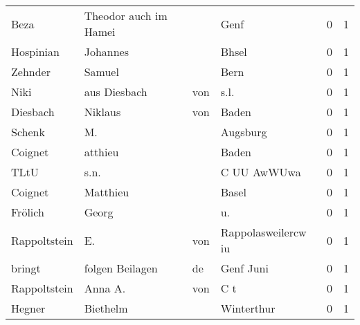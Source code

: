 \begin{tabular}{llllrr}
                     Beza &              Theodor auch im Hamei &             &                                        Genf &          0 &         1 \\
                Hospinian &                           Johannes &             &                                       Bhsel &          0 &         1 \\
                  Zehnder &                             Samuel &             &                                        Bern &          0 &         1 \\
                     Niki &                      aus  Diesbach &         von &                                        s.l. &          0 &         1 \\
                 Diesbach &                            Niklaus &         von &                                       Baden &          0 &         1 \\
                   Schenk &                                 M. &             &                                    Augsburg &          0 &         1 \\
                  Coignet &                            atthieu &             &                                       Baden &          0 &         1 \\
                     TLtU &                               s.n. &             &                                 C UU AwWUwa &          0 &         1 \\
                  Coignet &                           Matthieu &             &                                       Basel &          0 &         1 \\
                  Frölich &                              Georg &             &                                         u.  &          0 &         1 \\
             Rappoltstein &                                 E. &         von &                         Rappolasweilercw iu &          0 &         1 \\
                   bringt &                    folgen Beilagen &          de &                                   Genf Juni &          0 &         1 \\
             Rappoltstein &                            Anna A. &         von &                                         C t &          0 &         1 \\
                   Hegner &                           Biethelm &             &                                  Winterthur &          0 &         1 \\

\end{tabular}
